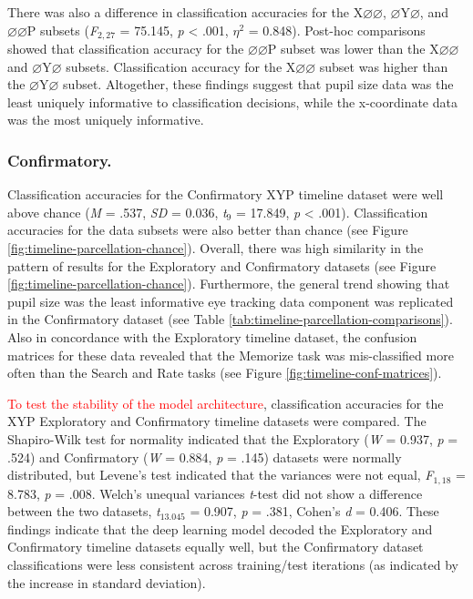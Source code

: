 \documentclass[
  english,
  man, donotrepeattitle,floatsintext]{apa6}
\begin{document}
There was also a difference in classification accuracies for the X\(\varnothing\varnothing\), \(\varnothing\)Y\(\varnothing\), and \(\varnothing\varnothing\)P subsets (\emph{F}\(_{2, 27}\) = 75.145, \emph{p} \textless{} .001, \textit{$\eta$}\(^{2}\) = 0.848). Post-hoc comparisons showed that classification accuracy for the \(\varnothing\varnothing\)P subset was lower than the X\(\varnothing\varnothing\) and \(\varnothing\)Y\(\varnothing\) subsets. Classification accuracy for the X\(\varnothing\varnothing\) subset was higher than the \(\varnothing\)Y\(\varnothing\) subset. Altogether, these findings suggest that pupil size data was the least uniquely informative to classification decisions, while the x-coordinate data was the most uniquely informative.

\subsubsection{Confirmatory.}

Classification accuracies for the Confirmatory XYP timeline dataset were well above chance (\emph{M} = .537, \emph{SD} = 0.036, \emph{t}\(_{9}\) = 17.849, \emph{p} \textless{} .001). Classification accuracies for the data subsets were also better than chance (see Figure \ref{fig:timeline-parcellation-chance}). Overall, there was high similarity in the pattern of results for the Exploratory and Confirmatory datasets (see Figure \ref{fig:timeline-parcellation-chance}). Furthermore, the general trend showing that pupil size was the least informative eye tracking data component was replicated in the Confirmatory dataset (see Table \ref{tab:timeline-parcellation-comparisons}). Also in concordance with the Exploratory timeline dataset, the confusion matrices for these data revealed that the Memorize task was mis-classified more often than the Search and Rate tasks (see Figure \ref{fig:timeline-conf-matrices}).

\textcolor{red}{To test the stability of the model architecture}, classification accuracies for the XYP Exploratory and Confirmatory timeline datasets were compared. The Shapiro-Wilk test for normality indicated that the Exploratory (\emph{W} = 0.937, \emph{p} = .524) and Confirmatory (\emph{W} = 0.884, \emph{p} = .145) datasets were normally distributed, but Levene's test indicated that the variances were not equal, \emph{F}\(_{1, 18}\) = 8.783, \emph{p} = .008. Welch's unequal variances \emph{t}-test did not show a difference between the two datasets, \emph{t}\(_{13.045}\) = 0.907, \emph{p} = .381, Cohen's \emph{d} = 0.406. These findings indicate that the deep learning model decoded the Exploratory and Confirmatory timeline datasets equally well, but the Confirmatory dataset classifications were less consistent across training/test iterations (as indicated by the increase in standard deviation).
\end{document}
